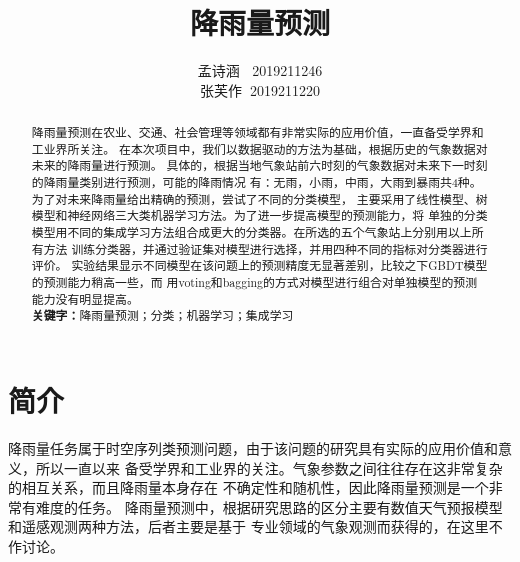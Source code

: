 \documentclass[UTF8]{ctexart}
\title{降雨量预测} %
\author{孟诗涵$\;\;$ 2019211246\\张芙作$\;\;$2019211220} %
\date{} %
\begin{document}
\normalsize

\maketitle %
\setlength{\baselineskip}{18pt}
\begin{abstract}
  降雨量预测在农业、交通、社会管理等领域都有非常实际的应用价值，一直备受学界和工业界所关注。
  在本次项目中，我们以数据驱动的方法为基础，根据历史的气象数据对未来的降雨量进行预测。
  具体的，根据当地气象站前六时刻的气象数据对未来下一时刻的降雨量类别进行预测，可能的降雨情况
  有：无雨，小雨，中雨，大雨到暴雨共4种。为了对未来降雨量给出精确的预测，尝试了不同的分类模型，
  主要采用了线性模型、树模型和神经网络三大类机器学习方法。为了进一步提高模型的预测能力，将
  单独的分类模型用不同的集成学习方法组合成更大的分类器。在所选的五个气象站上分别用以上所有方法
  训练分类器，并通过验证集对模型进行选择，并用四种不同的指标对分类器进行评价。
  实验结果显示不同模型在该问题上的预测精度无显著差别，比较之下GBDT模型的预测能力稍高一些，而
  用voting和bagging的方式对模型进行组合对单独模型的预测能力没有明显提高。
  \\

\textbf{关键字：}降雨量预测；分类；机器学习；集成学习
\end{abstract}

\section{简介}
降雨量任务属于时空序列类预测问题，由于该问题的研究具有实际的应用价值和意义，所以一直以来
备受学界和工业界的关注。气象参数之间往往存在这非常复杂的相互关系，而且降雨量本身存在
不确定性和随机性，因此降雨量预测是一个非常有难度的任务。
降雨量预测中，根据研究思路的区分主要有数值天气预报模型和遥感观测两种方法\cite{bit1}，后者主要是基于
专业领域的气象观测而获得的，在这里不作讨论。
\end{document}
